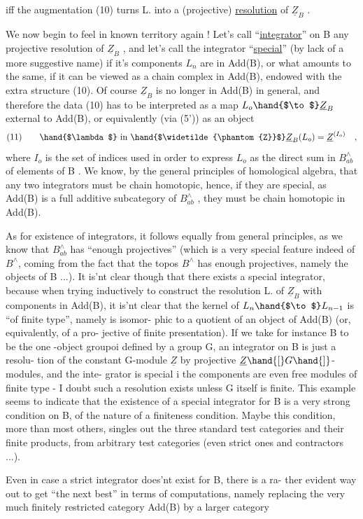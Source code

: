 iff the augmentation (10) turns L. into a (projective) \uline{resolution} of $\underline{Z}_B$ .

We now begin to feel in known territory again ! Let's call 
``\uline{integrator}'' on B any projective resolution of $\underline{Z}_B$ , and let's call the
integrator ``\uline{special}'' (by lack of a more suggestive name) if it's components
$L_n$ are in Add(B), or what amounts to the same, if it can be viewed as a
chain complex in Add(B), endowed with the extra structure (10). 
Of course $\underline{Z}_B$ is no longer in Add(B) in general, and therefore the data
(10) has to be interpreted as a map $L_o \hand{$\to$} \underline{Z}_B$ external to Add(B), or
equivalently (via (5')) as an object 
\[ (11) \qquad \hand{$\lambda$} \text{ in } \hand{$\widetilde{\phantom{Z}}$}\underline{Z}_B(L_o) = \underline{Z}^{(I_o)} \quad , \]
where $I_o$ is the set of indices used in order to express $L_o$ as the direct
sum  in $B^{\wedge}_{ab}$ of elements of B . We know, by the general principles
of homological algebra, that any two integrators must be chain homotopic,
hence, if they are special, as Add(B) is a full additive subcategory of
$B^{\wedge}_{ab}$ , they must be chain homotopic in Add(B).

As for existence of integrators, it follows equally from general
principles, as we know that $B^{\wedge}_{ab}$ has ``enough projectives'' (which is a very
special feature indeed of $B^{\wedge}$, coming from the fact that the topos $B^{\wedge}$ has
enough projectives, namely the objects of B ...). It is'nt clear though
that there exists a special integrator, because when trying inductively
to construct the resolution L. of $\underline{Z}_B$ with components in Add(B), it is'nt
clear that the kernel of $L_n \hand{$\to$} L_{n-1}$ is ``of finite type'', namely is isomor-%
phic to a quotient of an object of Add(B) (or, equivalently,  of a pro-%
jective of finite presentation). If we take for instance B to be the one
-object groupoi defined by a group G, an integrator on B is just a resolu-%
tion of the constant G-module $\underline{Z}$ by projective $\underline{Z}\hand{[}G\hand{]}$-modules, and the inte-%
grator is special i the components are even free modules of finite type -
 I doubt such a resolution exists unless G itself is finite. This example
seems to indicate that the existence of a special integrator for B is a
very strong condition on B, of the nature of a  finiteness condition.
Maybe this condition, more than most others, singles out the three
standard test categories and their finite products, from arbitrary 
test categories (even strict ones and contractors ...).

Even in case a strict integrator does'nt exist for B, there is a ra-%
ther evident way out to get ``the next best'' in terms of computations,
namely replacing the very much finitely restricted category Add(B) by a
larger category

